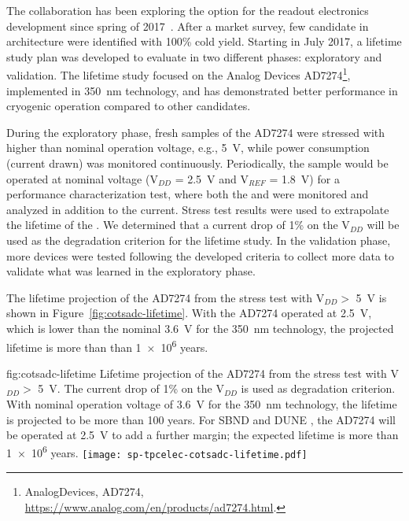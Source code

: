 The  collaboration has been exploring the   option 
for the  readout electronics development since spring of 
2017~\cite{Chen:2018zic}. After a market survey, few candidate  
in  architecture were identified with 100\% cold yield. Starting in
July 2017, a lifetime study plan was developed to evaluate  
 in two different phases: exploratory and validation. The 
lifetime study focused on the Analog Devices AD7274\footnote{AnalogDevices, AD7274\texttrademark{}, \url{https://www.analog.com/en/products/ad7274.html}.},
implemented in  \SI{350}{nm}  technology, and has demonstrated   better performance in cryogenic operation compared to other candidates. 

During the exploratory phase, fresh samples of the   
AD7274 were stressed with higher than nominal operation voltage, e.g., 
\SI{5}{V}, while power consumption (current drawn) was monitored continuously. 
Periodically, the sample would be operated at nominal voltage (V$_{DD}$ = \SI{2.5}{V} 
and V$_{REF}$ = \SI{1.8}{V}) for a performance characterization test, where 
both the  and  were monitored and analyzed in addition 
to the current. %
Stress test results were used to extrapolate the 
lifetime of the  . We determined that a current drop 
of \num{1}\% on the V$_{DD}$ will be used as the degradation criterion for the lifetime 
study. In the validation phase, more devices were tested following the developed 
criteria to collect more data to validate what was learned in the exploratory phase.

The lifetime projection of the AD7274  from the stress 
test with V$_{DD} >$ \SI{5}{V} is shown in Figure~\ref{fig:cotsadc-lifetime}. 
With the AD7274 operated at \SI{2.5}{V}, which is lower than the nominal 
\SI{3.6}{V} for the \SI{350}{nm}  technology, the projected lifetime 
is more than than \num{1e6} years.

\begin{dunefigure}
{fig:cotsadc-lifetime}
{Lifetime projection of the   AD7274 from the stress test 
with V$_{DD} >$ \SI{5}{V}. The current drop of 1\% on the V$_{DD}$ is used as 
degradation criterion. With nominal operation voltage of \SI{3.6}{V} for the 
\SI{350}{nm}  technology, the lifetime is projected to be more 
than 100 years. For SBND and DUNE , the AD7274 will be operated at 
\SI{2.5}{V} to add a further margin; the expected lifetime is more 
than \num{1e6} years.}
\texttt{[image: sp-tpcelec-cotsadc-lifetime.pdf]}
\end{dunefigure}

